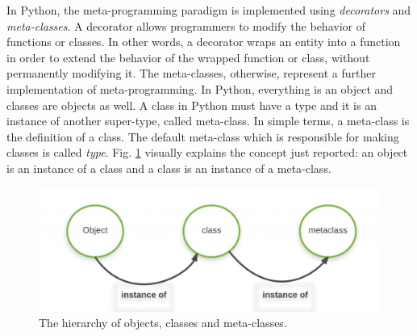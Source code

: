 In Python, the meta-programming paradigm is implemented using \textit{decorators} and \textit{meta-classes}. A decorator allows programmers to modify the behavior of functions or classes. In other words, a decorator wraps an entity into a function in order to extend the behavior of the wrapped function or class, without permanently modifying it. The meta-classes, otherwise, represent a further implementation of meta-programming. In Python, everything is an object and classes are objects as well. A class in Python must have a type and it is an instance of another super-type, called meta-class. In simple terms, a meta-class is the definition of a class. The default meta-class which is responsible for making classes is called \textit{type}. Fig. \ref{fig:metaclass} visually explains the concept just reported: an object is an instance of a class and a class is an instance of a meta-class.

\begin{figure}[h!]
	\centering
	\includegraphics[width=\textwidth]{images/metaclass-hierarchy.jpeg}
	\caption{The hierarchy of objects, classes and meta-classes.}
	\label{fig:metaclass}
\end{figure}

